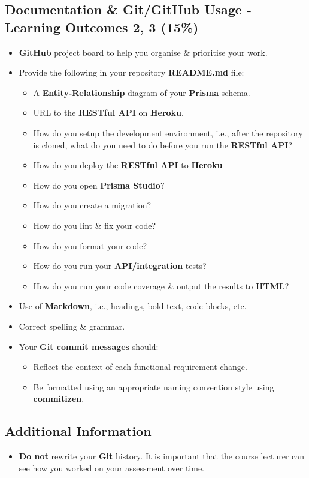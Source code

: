 \documentclass{article}
\begin{document}
\subsection*{Documentation \& Git/GitHub Usage - Learning Outcomes 2, 3 (15\%)}
\begin{itemize}
	\item \textbf{GitHub} project board to help you organise \& prioritise your work. 
	\item Provide the following in your repository \textbf{README.md} file:
	\begin{itemize}
		\item A \textbf{Entity-Relationship} diagram of your \textbf{Prisma} schema.
		\item URL to the \textbf{RESTful API} on \textbf{Heroku}.
		\item How do you setup the development environment, i.e., after the repository is cloned, what do you need to do before you run the \textbf{RESTful API}?
		\item How do you deploy the \textbf{RESTful API} to \textbf{Heroku}
		\item How do you open \textbf{Prisma Studio}?
		\item How do you create a migration?
		\item How do you lint \& fix your code?
		\item How do you format your code?
		\item How do you run your \textbf{API/integration} tests?
		\item How do you run your code coverage \& output the results to \textbf{HTML}?
	\end{itemize}
	\item Use of \textbf{Markdown}, i.e., headings, bold text, code blocks, etc.
	\item Correct spelling \& grammar. 
	\item Your \textbf{Git commit messages} should:
	\begin{itemize}
		\item Reflect the context of each functional requirement change.
		\item Be formatted using an appropriate naming convention style using \textbf{commitizen}.
	\end{itemize}	
\end{itemize}

\subsection*{Additional Information}
\begin{itemize}
	\item \textbf{Do not} rewrite your \textbf{Git} history. It is important that the course lecturer can see how you worked on your assessment over time.
\end{itemize}
\end{document}
